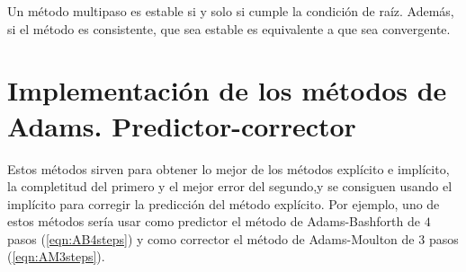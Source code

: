 \begin{theorem}
    Un método multipaso es estable si y solo si cumple la condición de raíz.
    Además, si el método es consistente,
    que sea estable es equivalente a que sea convergente.
\end{theorem}

\section{Implementación de los métodos de Adams. Predictor-corrector}

Estos métodos sirven para obtener lo mejor de los métodos explícito e implícito,
la completitud del primero y el mejor error del segundo,y se consiguen usando
el implícito para corregir la predicción del método explícito. Por ejemplo,
uno de estos métodos  sería usar como predictor el método de Adams-Bashforth 
de $4$ pasos (\cref{eqn:AB4steps}) y como corrector el método de Adams-Moulton
de $3$ pasos (\cref{eqn:AM3steps}).


